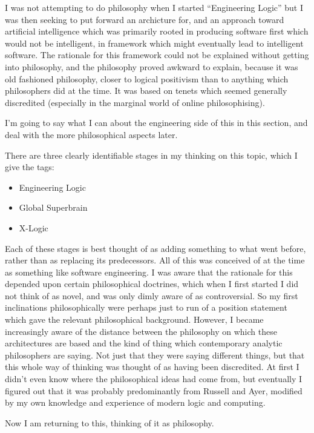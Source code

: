 \documentclass[10pt,titlepage]{book}
\begin{document}
I was not attempting to do philosophy when I started ``Engineering Logic'' but I was then seeking to put forward an archicture for, and an approach toward artificial intelligence which was primarily rooted in producing software first which would not be intelligent, in framework which might eventually lead to intelligent software.
The rationale for this framework could not be explained without getting into philosophy, and the philosophy proved awkward to explain, because it was old fashioned philosophy, closer to logical positivism than to anything which philosophers did at the time.
It was based on tenets which seemed generally discredited (especially in the marginal world of online philosophising).

I'm going to say what I can about the engineering side of this in this section, and deal with the more philosophical aspects later.

There are three clearly identifiable stages in my thinking on this topic, which I give the tags:

\begin{itemize}
\item Engineering Logic
\item Global Superbrain
\item X-Logic
\end{itemize}

Each of these stages is best thought of as adding something to what went before, rather than as replacing its predecessors.
All of this was conceived of at the time as something like software engineering.
I was aware that the rationale for this depended upon certain philosophical doctrines, which when I first started I did not think of as novel, and was only dimly aware of as controversial.
So my first inclinations philosophically were perhaps just to run of a position statement which gave the relevant philosophical background.
However, I became increasingly aware of the distance between the philosophy on which these architectures are based and the kind of thing which contemporary analytic philosophers are saying.
Not just that they were saying different things, but that this whole way of thinking was thought of as having been discredited.
At first I didn't even know where the philosophical ideas had come from, but eventually I figured out that it was probably predominantly from Russell and Ayer, modified by my own knowledge and experience of modern logic and computing.

Now I am returning to this, thinking of it as philosophy.
\end{document}
